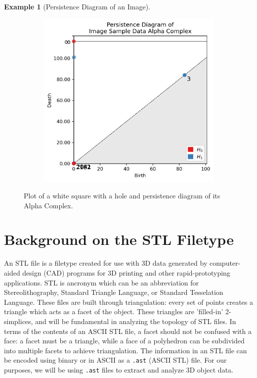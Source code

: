 \documentclass[ma]{uncgdissertationexp}
\theoremstyle{plain}
\theoremstyle{definition}
\newtheorem{example}[theorem]{Example}
\theoremstyle{remark}
\begin{document}
\begin{example}[Persistence Diagram of an Image]
\begin{figure}[H]
\begin{subfigure}[b]{0.45\textwidth}
    \end{subfigure}
    \begin{subfigure}[b]{0.5\textwidth}
        \centering
        \includegraphics[width=\textwidth]{image_data_persdia.png}
    \end{subfigure}
    \caption{Plot of a white square with a hole and persistence diagram of its Alpha Complex.}
    \label{fig:image_data_persdia}
\end{figure}
\end{example}
\newpage
\section{Background on the STL Filetype}
\par An STL file is a filetype created for use with 3D data generated by computer-aided design (CAD) programs for 3D printing and other rapid-prototyping applications. STL is ancronym which can be an abbreviation for Stereolithography, Standard Triangle Language, or Standard Tesselation Language. These files are built through triangulation: every set of points creates a triangle which acts as a facet of the object. These triangles are 'filled-in' 2-simplices, and will be fundamental in analyzing the topology of STL files. In terms of the contents of an ASCII STL file, a facet should not be confused with a face: a facet must be a triangle, while a face of a polyhedron can be subdivided into multiple facets to achieve triangulation. The information in an STL file can be encoded using binary or in ASCII as a \verb".ast" (ASCII STL) file. For our purposes, we will be using \verb".ast" files to extract and analyze 3D object data. \cite{analysis_of_stl}
\end{document}
